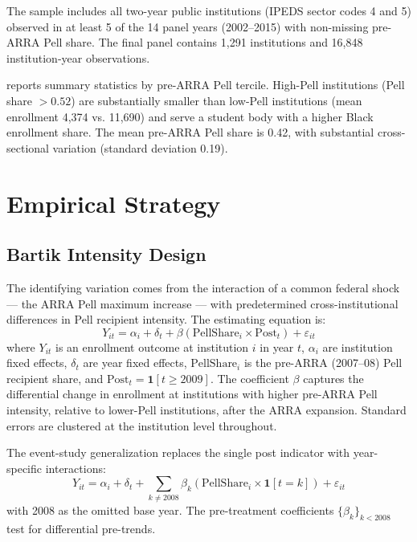 \documentclass[12pt]{article}
\begin{document}
The sample includes all two-year public institutions (IPEDS sector codes 4 and 5) observed in at least 5 of the 14 panel years (2002--2015) with non-missing pre-ARRA Pell share. The final panel contains 1,291 institutions and 16,848 institution-year observations.



 reports summary statistics by pre-ARRA Pell tercile. High-Pell institutions (Pell share $> 0.52$) are substantially smaller than low-Pell institutions (mean enrollment 4,374 vs. 11,690) and serve a student body with a higher Black enrollment share. The mean pre-ARRA Pell share is 0.42, with substantial cross-sectional variation (standard deviation 0.19).

\section{Empirical Strategy}

\subsection{Bartik Intensity Design}

The identifying variation comes from the interaction of a common federal shock --- the ARRA Pell maximum increase --- with predetermined cross-institutional differences in Pell recipient intensity. The estimating equation is:
\begin{equation}
Y_{it} = \alpha_i + \delta_t + \beta \left( \text{PellShare}_i \times \text{Post}_t \right) + \varepsilon_{it}
\label{eq:static}
\end{equation}
where $Y_{it}$ is an enrollment outcome at institution $i$ in year $t$, $\alpha_i$ are institution fixed effects, $\delta_t$ are year fixed effects, $\text{PellShare}_i$ is the pre-ARRA (2007--08) Pell recipient share, and $\text{Post}_t = \mathbf{1}[t \geq 2009]$. The coefficient $\beta$ captures the differential change in enrollment at institutions with higher pre-ARRA Pell intensity, relative to lower-Pell institutions, after the ARRA expansion. Standard errors are clustered at the institution level throughout.

The event-study generalization replaces the single post indicator with year-specific interactions:
\begin{equation}
Y_{it} = \alpha_i + \delta_t + \sum_{k \neq 2008} \beta_k \left( \text{PellShare}_i \times \mathbf{1}[t = k] \right) + \varepsilon_{it}
\label{eq:eventstudy}
\end{equation}
with 2008 as the omitted base year. The pre-treatment coefficients $\{\beta_k\}_{k < 2008}$ test for differential pre-trends.
\end{document}
